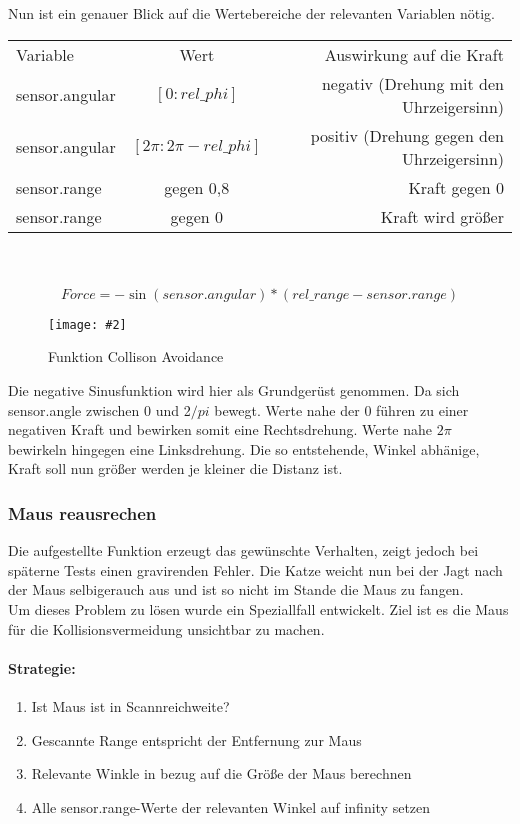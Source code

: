 \documentclass[
a4paper,     %
12pt         %
]{scrartcl}  %
\newcommand{\mygraphics}[3]{
\begin{figure}[!h]
  \begin{center}
    \texttt{[image: \#2]} \\    
    \caption{#3}\label{fig:#2}
  \end{center}
\end{figure}

}
\begin{document}
Nun ist ein genauer Blick auf die Wertebereiche der relevanten Variablen nötig.\\

 \begin{tabular}[h]{lcr}
 Variable & Wert & Auswirkung auf die Kraft \\
 sensor.angular & $[0 : rel\_phi]$ & negativ (Drehung mit den Uhrzeigersinn) \\
 sensor.angular & $[2\pi : 2\pi-rel\_phi]$ & positiv (Drehung gegen den Uhrzeigersinn) \\
 sensor.range & gegen 0,8  & Kraft gegen 0 \\
 sensor.range & gegen 0 & Kraft wird größer \\
 
 \end{tabular}
\\
\\

\[ Force= -\sin(sensor.angular) * (rel\_range-sensor.range) \]
\mygraphics{0.7\textwidth}{Kollision.png}{Funktion Collison Avoidance} 
Die negative Sinusfunktion wird hier als Grundgerüst genommen. Da sich sensor.angle zwischen 0 und 2$/pi$ bewegt. Werte nahe der 0 führen zu einer negativen Kraft und bewirken somit eine Rechtsdrehung. Werte nahe $2\pi $ bewirkeln hingegen eine Linksdrehung. Die so entstehende, Winkel abhänige, Kraft soll nun größer werden je kleiner die Distanz ist.

 
\subsubsection{Maus reausrechen}
Die aufgestellte Funktion erzeugt das gewünschte Verhalten, zeigt jedoch bei späterne Tests einen gravirenden Fehler. Die Katze weicht nun bei der Jagt nach der Maus selbigerauch aus und ist so nicht im Stande die Maus zu fangen. \\
Um dieses Problem zu lösen wurde ein Speziallfall entwickelt.
Ziel ist es die Maus für die Kollisionsvermeidung unsichtbar zu machen. \\
\paragraph{Strategie:}
\begin{enumerate}
\item Ist Maus ist in Scannreichweite?
\item Gescannte Range entspricht der Entfernung zur Maus
\item Relevante Winkle in bezug auf die Größe der Maus berechnen
\item Alle sensor.range-Werte der relevanten Winkel auf infinity setzen
\end{enumerate}
\end{document}
